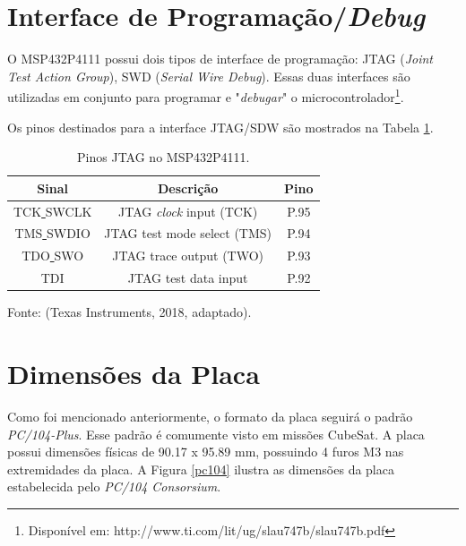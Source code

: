 \section{Interface de Programação/\textit{Debug}}

O MSP432P4111 possui dois tipos de interface de programação: JTAG (\textit{Joint Test Action Group}), SWD (\textit{Serial Wire Debug}). Essas duas interfaces são utilizadas em conjunto para programar e "\textit{debugar}" o microcontrolador\footnote{Disponível em: http://www.ti.com/lit/ug/slau747b/slau747b.pdf}. 

Os pinos destinados para a interface JTAG/SDW são mostrados na Tabela \ref{jtagPin}.

\begin{table}[h]
	\centering
	\caption{Pinos JTAG no MSP432P4111.}
	\label{jtagPin}
	\begin{tabular}{@{}ccc@{}}
		\toprule
		Sinal   & Descrição & Pino 
		\\ \midrule
		TCK\underline{ }SWCLK & JTAG \textit{clock} input (TCK) & P.95
		\\ \midrule
		TMS\underline{ }SWDIO & JTAG test mode select (TMS) & P.94
		\\ \midrule
		TDO\underline{ }SWO & JTAG trace output (TWO) & P.93
		\\ \midrule
		TDI & JTAG test data input & P.92        
		\\ \bottomrule
	\end{tabular}
\begin{center}
	\footnotesize{
		Fonte: (Texas Instruments, 2018, adaptado).}
\end{center}
\end{table}





\section{Dimensões da Placa}

Como foi mencionado anteriormente, o formato da placa seguirá o padrão \textit{PC/104-Plus}. Esse padrão é comumente visto em missões CubeSat. A placa possui dimensões físicas de 90.17 x 95.89 mm, possuindo 4 furos M3 nas extremidades da placa. A Figura \ref{pc104} ilustra as dimensões da placa estabelecida pelo \textit{PC/104 Consorsium}.

